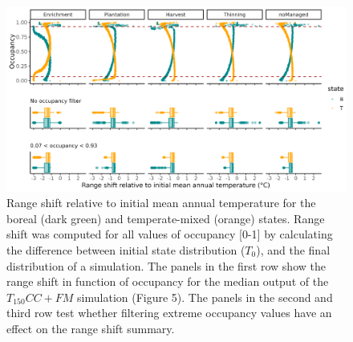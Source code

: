 \hypertarget{fig:sim-result-supp2_ch1}{%
\begin{figure}
\centering
\includegraphics{manuscript/img/sim-result_supp5.png}
\caption[{Range shift relative to initial mean annual temperature for
the boreal (dark green) and temperate-mixed (orange) states.}]{Range
shift relative to initial mean annual temperature for the boreal (dark
green) and temperate-mixed (orange) states. Range shift was computed for
all values of occupancy {[}0-1{]} by calculating the difference between
initial state distribution (\(T_0\)), and the final distribution of a
simulation. The panels in the first row show the range shift in function
of occupancy for the median output of the \(T_{150}CC + FM\) simulation
(Figure 5). The panels in the second and third row test whether
filtering extreme occupancy values have an effect on the range shift
summary.}
\label{fig:sim-result-supp2_ch1}
\end{figure}
}

\newpage

